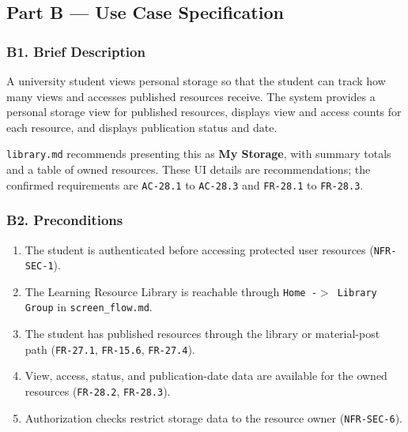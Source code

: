 \documentclass[12pt]{article}
\begin{document}
\subsection*{Part B --- Use Case Specification}
\par\medskip

\hypertarget{sec:b1-brief-description}{}
\subsubsection*{B1. Brief Description}
\par\medskip

A university student views personal storage so that the student can track how many views and accesses published resources receive. The system provides a personal storage view for published resources, displays view and access counts for each resource, and displays publication status and date.
\par\medskip

\texttt{library.md} recommends presenting this as \textbf{My Storage}, with summary totals and a table of owned resources. These UI details are recommendations; the confirmed requirements are \texttt{AC-28.1} to \texttt{AC-28.3} and \texttt{FR-28.1} to \texttt{FR-28.3}.
\par\medskip

\hypertarget{sec:b2-preconditions}{}
\subsubsection*{B2. Preconditions}
\par\medskip

\begin{enumerate}
\item The student is authenticated before accessing protected user resources (\texttt{NFR-SEC-1}).
\item The Learning Resource Library is reachable through \texttt{Home -$>$ Library Group} in \texttt{screen\_flow.md}.
\item The student has published resources through the library or material-post path (\texttt{FR-27.1}, \texttt{FR-15.6}, \texttt{FR-27.4}).
\item View, access, status, and publication-date data are available for the owned resources (\texttt{FR-28.2}, \texttt{FR-28.3}).
\item Authorization checks restrict storage data to the resource owner (\texttt{NFR-SEC-6}).
\end{enumerate}
\par\medskip
\end{document}
